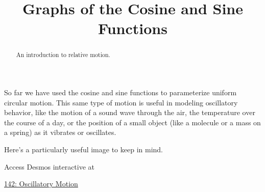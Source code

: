 \documentclass{ximera}
\title{Graphs of the Cosine and Sine Functions}
\begin{document}
\begin{abstract}
An introduction to relative motion.
\end{abstract}
\maketitle


So far we have used the cosine and sine functions to parameterize uniform circular motion. This same type of motion is useful in modeling oscillatory behavior, like the motion of a sound wave through the air, the temperature over the course of a day, or the position of a small object (like a molecule or a mass on a spring) as it vibrates or oscillates.

Here's a particularly useful image to keep in mind.

\begin{exploration}   \label{Ertr64yhd}

Access Desmos interactive at
 
\href{https://www.desmos.com/calculator/dyk36an04s}{142: Oscillatory Motion}

 
\begin{onlineOnly}
    \begin{center}
\end{center}
\end{onlineOnly}


\end{exploration}
\end{document}
